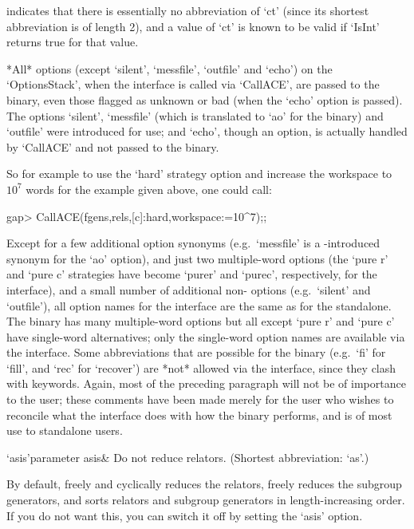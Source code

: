 indicates that there is essentially no abbreviation of `ct' (since its
shortest abbreviation is of length 2),  and a value of  `ct' is  known
to be valid if `IsInt' returns true for that value.

*All* options (except `silent', `messfile', `outfile' and `echo')   on
the `OptionsStack', when the {\ACE} interface is called via `CallACE',
are passed to the {\ACE} binary, even those flagged  as unknown or bad
(when the `echo' option is passed). The options `silent',   `messfile'
(which  is  translated  to  `ao'  for  the  binary) and `outfile' were
introduced for {\GAP} use;  and `echo',  though an {\ACE} option,   is 
actually handled by `CallACE' and not passed to the binary.

So  for example to  use the  `hard' strategy  option and  increase the
workspace to $10^7$ words for the example given above, one could call:

\begintt
gap> CallACE(fgens,rels,[c]:hard,workspace:=10^7);;
\endtt

Except for a few additional option synonyms (e.g.~`messfile' is a 
{\GAP}-introduced synonym for the `ao' {\ACE} option), and just two
multiple-word {\ACE} options (the `pure r' and `pure c' strategies
have become `purer' and `purec', respectively, for the {\GAP} interface),
and a small number of additional non-{\ACE} options (e.g.~`silent'
and `outfile'), all option names for the interface are the same as for
the {\ACE} standalone. The {\ACE} binary has many multiple-word options
but all except `pure r' and `pure c' have single-word alternatives;
only the single-word option names are available via the {\GAP} interface.
Some abbreviations that are possible for the {\ACE} binary (e.g.~`fi'
for `fill', and `rec' for `recover') are *not* allowed via the {\GAP}
interface, since they clash with {\GAP} keywords. Again, most of the
preceding paragraph will not be of importance to the {\GAP} user;
these comments have been made merely for the user who wishes to reconcile
what the interface does with how the {\ACE} binary performs, and is
of most use to standalone users.


\beginitems
\>`asis'{parameter asis}&
Do not reduce relators. (Shortest abbreviation: `as'.)
\enditems

By default, {\ACE} freely  and cyclically reduces the relators, freely
reduces  the  subgroup generators,  and  sorts  relators and  subgroup
generators in length-increasing  order.  If you do not  want this, you
can switch it off by setting the `asis' option.

